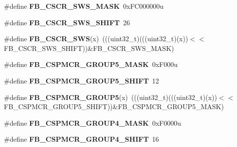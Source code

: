 \begin{DoxyCompactItemize}
\item 
\#define {\bfseries F\+B\+\_\+\+C\+S\+C\+R\+\_\+\+S\+W\+S\+\_\+\+M\+A\+SK}~0x\+F\+C000000u\hypertarget{group__FB__Register__Masks_ga1036d22baaa692a66480d3ef93bc9729}{}\label{group__FB__Register__Masks_ga1036d22baaa692a66480d3ef93bc9729}

\item 
\#define {\bfseries F\+B\+\_\+\+C\+S\+C\+R\+\_\+\+S\+W\+S\+\_\+\+S\+H\+I\+FT}~26\hypertarget{group__FB__Register__Masks_ga1ba720e1700a6ddc15457b55d8fbb376}{}\label{group__FB__Register__Masks_ga1ba720e1700a6ddc15457b55d8fbb376}

\item 
\#define {\bfseries F\+B\+\_\+\+C\+S\+C\+R\+\_\+\+S\+WS}(x)~(((uint32\+\_\+t)(((uint32\+\_\+t)(x))$<$$<$F\+B\+\_\+\+C\+S\+C\+R\+\_\+\+S\+W\+S\+\_\+\+S\+H\+I\+FT))\&F\+B\+\_\+\+C\+S\+C\+R\+\_\+\+S\+W\+S\+\_\+\+M\+A\+SK)\hypertarget{group__FB__Register__Masks_ga8c204c94806499d2bbc6acc6e829e80a}{}\label{group__FB__Register__Masks_ga8c204c94806499d2bbc6acc6e829e80a}

\item 
\#define {\bfseries F\+B\+\_\+\+C\+S\+P\+M\+C\+R\+\_\+\+G\+R\+O\+U\+P5\+\_\+\+M\+A\+SK}~0x\+F000u\hypertarget{group__FB__Register__Masks_ga2c198cc055fa5fd82f9f9441613af96d}{}\label{group__FB__Register__Masks_ga2c198cc055fa5fd82f9f9441613af96d}

\item 
\#define {\bfseries F\+B\+\_\+\+C\+S\+P\+M\+C\+R\+\_\+\+G\+R\+O\+U\+P5\+\_\+\+S\+H\+I\+FT}~12\hypertarget{group__FB__Register__Masks_gaa406022bcdd78d1d96d379efcf539ca7}{}\label{group__FB__Register__Masks_gaa406022bcdd78d1d96d379efcf539ca7}

\item 
\#define {\bfseries F\+B\+\_\+\+C\+S\+P\+M\+C\+R\+\_\+\+G\+R\+O\+U\+P5}(x)~(((uint32\+\_\+t)(((uint32\+\_\+t)(x))$<$$<$F\+B\+\_\+\+C\+S\+P\+M\+C\+R\+\_\+\+G\+R\+O\+U\+P5\+\_\+\+S\+H\+I\+FT))\&F\+B\+\_\+\+C\+S\+P\+M\+C\+R\+\_\+\+G\+R\+O\+U\+P5\+\_\+\+M\+A\+SK)\hypertarget{group__FB__Register__Masks_ga61aeb8bb9251b57140fde249ce7670fa}{}\label{group__FB__Register__Masks_ga61aeb8bb9251b57140fde249ce7670fa}

\item 
\#define {\bfseries F\+B\+\_\+\+C\+S\+P\+M\+C\+R\+\_\+\+G\+R\+O\+U\+P4\+\_\+\+M\+A\+SK}~0x\+F0000u\hypertarget{group__FB__Register__Masks_gaa24d34ff345a0131f93f71c38e20b7a5}{}\label{group__FB__Register__Masks_gaa24d34ff345a0131f93f71c38e20b7a5}

\item 
\#define {\bfseries F\+B\+\_\+\+C\+S\+P\+M\+C\+R\+\_\+\+G\+R\+O\+U\+P4\+\_\+\+S\+H\+I\+FT}~16\hypertarget{group__FB__Register__Masks_ga53fde1abc71ae9149418ea7fb6e53fba}{}\label{group__FB__Register__Masks_ga53fde1abc71ae9149418ea7fb6e53fba}


\end{DoxyCompactItemize}
